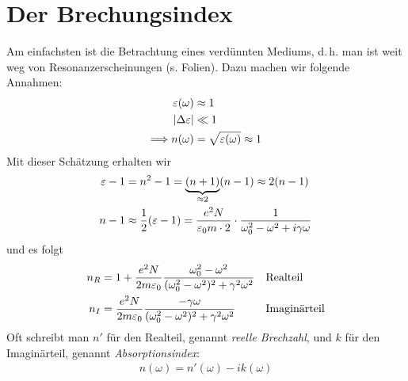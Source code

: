 \section{Der Brechungsindex}
Am einfachsten ist die Betrachtung eines verdünnten Mediums,
d.\,h. man ist weit weg von Resonanzerscheinungen (s. Folien).
Dazu machen wir folgende Annahmen:
\begin{align*}
  \varepsilon(\omega) &\approx 1\\
  |\Delta\varepsilon| &\ll 1\\
\Longrightarrow n(\omega) &= \sqrt{\varepsilon(\omega)} \approx 1
\end{align*}
Mit dieser Schätzung erhalten wir
\begin{align*}
  \varepsilon - 1 &= n^2-1 = \underbrace{(n+1)}_{\approx 2}(n-1) \approx 2(n-1)\\
  n-1 &\approx \frac{1}{2} (\varepsilon -1) 
  = \frac{e^2N}{\varepsilon_0 m\cdot 2}\cdot
  \frac{1}{\omega_0^2-\omega^2 + i\gamma\omega}
\end{align*}
und es folgt
\begin{align*}
  n_R &= 1 + \frac{e^2N}{2m\varepsilon_0} 
        \frac{\omega_0^2-\omega^2}{(\omega_0^2-\omega^2)^2 + \gamma^2\omega^2}
  && \text{Realteil}\\
  n_I &= \frac{e^2N}{2m\varepsilon_0}
        \frac{-\gamma\omega}{(\omega_0^2-\omega^2)^2 + \gamma^2\omega^2}
  && \text{Imaginärteil}\\
\end{align*}
Oft schreibt man $n'$ für den Realteil, genannt 
\emph{reelle Brechzahl}, und 
$k$ für den Imaginärteil, genannt
\emph{Absorptionsindex}:
\begin{gather*}
  n(\omega) = n'(\omega) - ik(\omega)
\end{gather*}%
%
%


